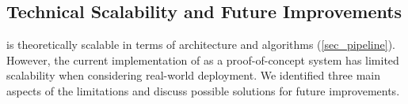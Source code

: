 





 

\subsection{Technical Scalability and Future Improvements}
\system{} is theoretically scalable in terms of architecture and algorithms (\autoref{sec_pipeline}). However, the current implementation of \system{} as a proof-of-concept system has limited scalability when considering real-world deployment. We identified three main aspects of the limitations and discuss possible solutions for future improvements.

